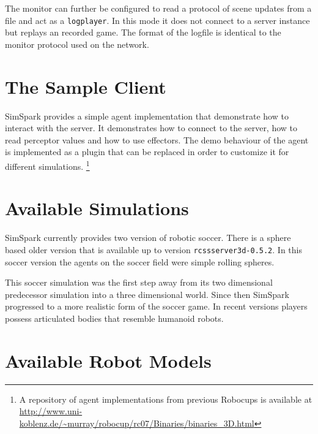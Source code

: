 The monitor can further be configured to read a protocol of scene
updates from a file and act as a \texttt{logplayer}. In this mode it
does not connect to a server instance but replays an recorded
game. The format of the logfile is identical to the monitor protocol
used on the network.

\section{The Sample Client}

SimSpark provides a simple agent implementation that demonstrate how
to interact with the server. It demonstrates how to connect to the
server, how to read perceptor values and how to use effectors. The
demo behaviour of the agent is implemented as a plugin that can be
replaced in order to customize it for different
simulations. \footnote{A repository of agent implementations from
previous Robocups is available at
\url{http://www.uni-koblenz.de/~murray/robocup/rc07/Binaries/binaries_3D.html}}

\section{Available Simulations}

SimSpark currently provides two version of robotic soccer. There is a
sphere based older version that is available up to version
\texttt{rcssserver3d-0.5.2}. In this soccer version the agents on the
soccer field were simple rolling spheres. 

This soccer simulation was the first step away from its two
dimensional predecessor simulation into a three dimensional
world. Since then SimSpark progressed to a more realistic form of the
soccer game. In recent versions players possess articulated bodies
that resemble humanoid robots.

\section{Available Robot Models}


